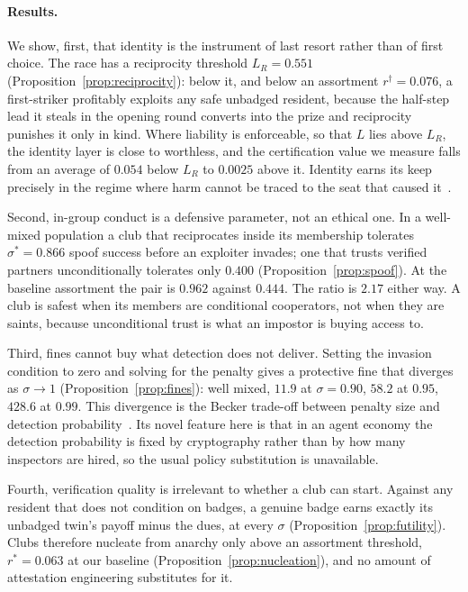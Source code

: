 \documentclass[11pt,a4paper]{article}
\theoremstyle{definition}
\begin{document}
\paragraph{Results.}
We show, first, that identity is the instrument of last resort rather than of
first choice. The race has a reciprocity threshold $L_R = 0.551$
(Proposition~\ref{prop:reciprocity}): below it, and below an assortment
$r^{\dagger} = 0.076$, a first-striker profitably exploits any safe unbadged
resident, because the half-step lead it steals in the opening round converts
into the prize and reciprocity punishes it only in kind. Where liability is
enforceable, so that $L$ lies above $L_R$, the identity layer is close to
worthless, and the certification value we measure falls from an average of
$0.054$ below $L_R$ to $0.0025$ above it. Identity earns its keep precisely in the
regime where harm cannot be traced to the seat that caused
it~\citep{chan2024visibility,kolt2025governing}.

Second, in-group conduct is a defensive parameter, not an ethical one. In a
well-mixed population a club that reciprocates inside its membership tolerates
$\sigma^{*} = 0.866$ spoof success before an exploiter invades; one that trusts
verified partners unconditionally tolerates only $0.400$
(Proposition~\ref{prop:spoof}). At the baseline assortment the pair is $0.962$
against $0.444$. The
ratio is $2.17$ either way. A club is safest when its members are conditional
cooperators, not when they are saints, because unconditional trust is what an
impostor is buying access to.

Third, fines cannot buy what detection does not deliver. Setting the invasion
condition to zero and solving for the penalty gives a protective fine that
diverges as $\sigma \to 1$ (Proposition~\ref{prop:fines}): well mixed, $11.9$ at
$\sigma = 0.90$, $58.2$ at $0.95$, $428.6$ at $0.99$. This divergence is the
Becker trade-off between penalty size and detection
probability~\citep{becker1968crime}. Its novel feature here is that in an agent
economy the detection probability is fixed by cryptography rather than by how
many inspectors are hired, so the usual policy substitution is unavailable.

Fourth, verification quality is irrelevant to whether a club can start. Against
any resident that does not condition on badges, a genuine badge earns exactly
its unbadged twin's payoff minus the dues, at every $\sigma$
(Proposition~\ref{prop:futility}). Clubs therefore nucleate from anarchy only above an
assortment threshold, $r^{*} = 0.063$ at our baseline
(Proposition~\ref{prop:nucleation}), and no amount of attestation engineering
substitutes for it.
\end{document}
